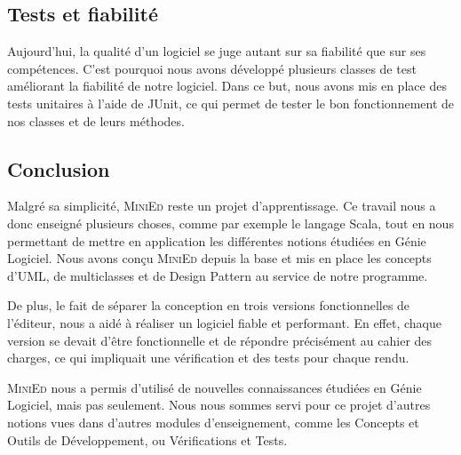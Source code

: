 \documentclass[a4paper]{article}
\begin{document}
		\subsection{Tests et fiabilité}

		\vspace{0.5cm}

		Aujourd’hui, la qualité d’un logiciel se juge autant sur sa fiabilité que sur ses compétences. C’est pourquoi nous avons développé plusieurs classes de test améliorant la fiabilité de notre logiciel. Dans ce but, nous avons mis en place des tests unitaires à l’aide de JUnit, ce qui permet de tester le bon fonctionnement de nos classes et de leurs méthodes.

		\vspace{0.5cm}



	\begin{center}
		\section{Conclusion}
	\end{center}

	\vspace{0.5cm}

	Malgré sa simplicité, \textsc{MiniEd} reste un projet d'apprentissage. Ce travail nous a donc enseigné plusieurs choses, comme par exemple le langage Scala, tout en nous permettant de mettre en application les différentes notions étudiées en Génie Logiciel. Nous avons conçu \textsc{MiniEd} depuis la base et mis en place les concepts d'UML, de multiclasses et de Design Pattern au service de notre programme.

	\vspace{0.5cm}

	De plus, le fait de séparer la conception en trois versions fonctionnelles de l'éditeur, nous a aidé à réaliser un logiciel fiable et performant. En effet, chaque version se devait d'être fonctionnelle et de répondre précisément au cahier des charges, ce qui impliquait une vérification et des tests pour chaque rendu. 

	\vspace{0.5cm}

	\textsc{MiniEd} nous a permis d’utilisé de nouvelles connaissances étudiées en Génie Logiciel, mais pas seulement. Nous nous sommes servi pour ce projet d'autres notions vues dans d’autres modules d'enseignement, comme les Concepts et Outils de Développement, ou Vérifications et Tests.
\end{document}
